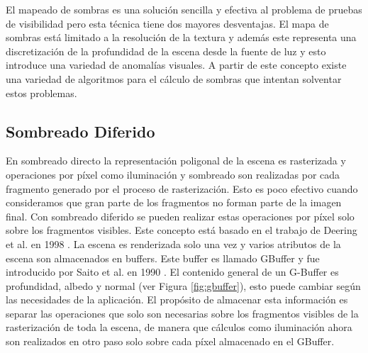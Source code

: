 El mapeado de sombras es una solución sencilla y efectiva al problema de pruebas de visibilidad pero esta técnica tiene dos mayores desventajas. El mapa de sombras está limitado a la resolución de la textura y además este representa una discretización de la profundidad de la escena desde la fuente de luz y esto introduce una variedad de anomalías visuales. A partir de este concepto existe una variedad de algoritmos para el cálculo de sombras que intentan solventar estos problemas.

\subsection{Sombreado Diferido}
\label{sub:deferred_rendering_theory}
En sombreado directo la representación poligonal de la escena es rasterizada y operaciones por píxel como iluminación y sombreado son realizadas por cada fragmento generado por el proceso de rasterización. Esto es poco efectivo cuando consideramos que gran parte de los fragmentos no forman parte de la imagen final.
Con sombreado diferido se pueden realizar estas operaciones por píxel solo sobre los fragmentos visibles. Este concepto está basado en el trabajo de Deering et al. en 1998 \cite{Deering:1988}. La escena es renderizada solo una vez y varios atributos de la escena son almacenados en buffers. Este buffer es llamado \ac{GBuffer} y fue introducido por Saito et al. en 1990 \cite{Saito:1990}. El contenido general de un G-Buffer es profundidad, albedo y normal (ver Figura \ref{fig:gbuffer}), esto puede cambiar según las necesidades de la aplicación. El propósito de almacenar esta información es separar las operaciones que solo son necesarias sobre los fragmentos visibles de la rasterización de toda la escena, de manera que cálculos como iluminación ahora son realizados en otro paso solo sobre cada píxel almacenado en el \ac{GBuffer}.

